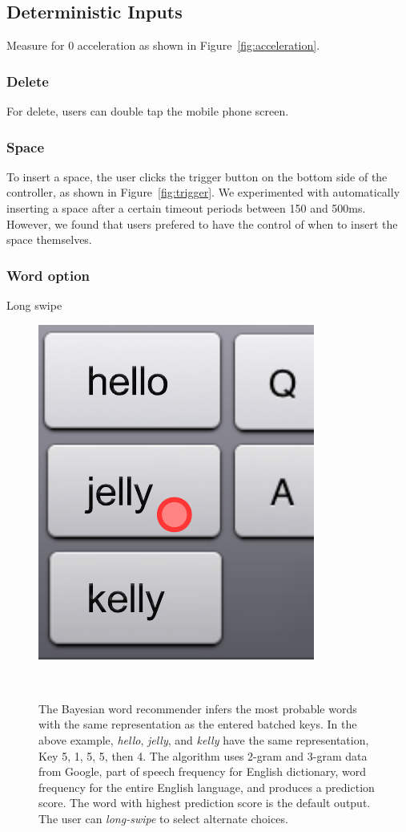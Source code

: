 \subsection{Deterministic Inputs}
Measure for 0 acceleration as shown in Figure~\ref{fig:acceleration}.

\subsubsection{Delete}
For delete, users can double tap the mobile phone screen.

\subsubsection{Space}
To insert a space, the user clicks the trigger button on the bottom side of the controller, as shown in Figure~\ref{fig:trigger}. 
We experimented with automatically inserting a space after a certain timeout periods between 150 and 500ms.  However, we found that users prefered to have the control of when to insert the space themselves.




\subsubsection{Word option}
Long swipe


\begin{figure}
  \centering

  \includegraphics[width=.3\columnwidth]{figures/multiword}
  
  \caption{The Bayesian word recommender infers the most probable words with the same representation as the entered batched keys. In the above example, \textit{hello}, \textit{jelly}, and \textit{kelly} have the same representation, Key 5, 1, 5, 5, then 4. The algorithm uses 2-gram and 3-gram data from Google, part of speech frequency for English dictionary, word frequency for the entire English language, and produces a prediction score. The word with highest prediction score is the default output.  The user can \textit{long-swipe} to select alternate choices.}
  ~\label{fig:multiword}
\end{figure}


